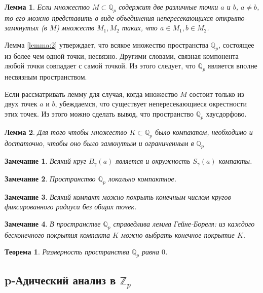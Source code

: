 \documentclass[master, och, diploma, times]{sty/SCWorks}
\theoremstyle{plain}
\newtheorem{thethm}{Теорема}[section]
\newtheorem{lemma}{Лемма}[section]
\newtheorem{note}{Замечание}[section]
\theoremstyle{definition}
\begin{document}
\begin{lemma} \label{lemma:2}
Если множество $M \subset \mathbb {Q}_p$ содержит две различные точки $a$ и $b$, $a \ne b$, то его можно представить в виде объединения непересекающихся открыто-замкнутых (в $M$) множеств $M_1, M_2$ таких, что $a \in M_1, b \in M_2$.
\end{lemma}

Лемма \eqref{lemma:2} утверждает, что всякое множество пространства $\mathbb {Q}_p$, состоящее из более чем одной точки, несвязно. Другими словами, связная компонента любой точки совпадает с самой точкой. Из этого следует, что $\mathbb {Q}_p$ является вполне несвязным пространством.

Если рассматривать лемму для случая, когда множество $M$ состоит только из двух точек $a$ и $b$, убеждаемся, что существует непересекающиеся окрестности этих точек. Из этого можно сделать вывод, что пространство $\mathbb {Q}_p$ хаусдорфово.

\begin{lemma}
Для того чтобы множество $K \subset \mathbb {Q}_p$ было компактом, необходимо и достаточно, чтобы оно было замкнутым и ограниченным в $\mathbb {Q}_p$
\end{lemma}

\begin{note}
Всякий круг $B_{\gamma}(a)$ является и окружность $S_{\gamma}(a)$ компакты.
\end{note}

\begin{note}
Пространство $\mathbb {Q}_p$ локально компактное.
\end{note}

\begin{note}
Всякий компакт можно покрыть конечным числом кругов фиксированного радиуса без общих точек.
\end{note}

\begin{note}
В пространстве $\mathbb {Q}_p$ справедлива лемма Гейне-Бореля: из каждого бесконечного покрытия компакта $K$ можно выбрать конечное покрытие $K$.
\end{note}

\begin{thethm}
Размерность пространства $\mathbb {Q}_p$ равна $0$.
\end{thethm}

\subsection{p-Адический анализ в $\mathbb {Z}_p$}
\end{document}
